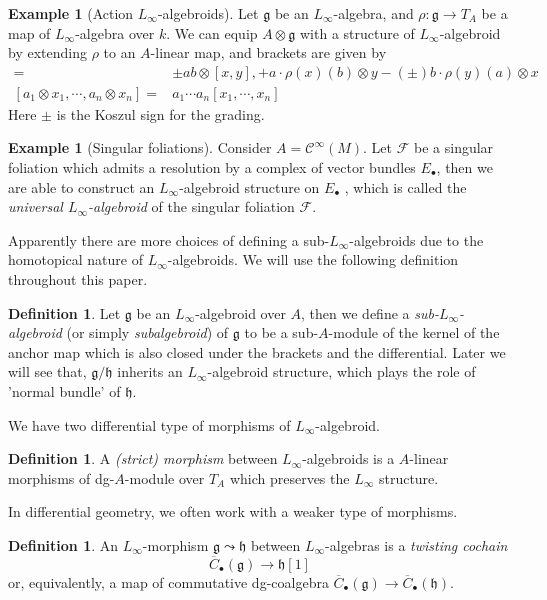 \documentclass[12pt]{amsart}
\theoremstyle{definition}
\newtheorem{example}[thm]{Example}
\newtheorem{defn}[thm]{Definition}
\theoremstyle{remark}
\numberwithin{equation}{section}
\newcommand{\CF}{{\mathcal F}}
\newcommand{\cinf}{{\mathcal C}^{\infty}}
\newcommand{\1}{{\mathbb{1}}}
\newcommand{\g}{\mathfrak{g}}
\newcommand{\h}{\mathfrak{h}}
\begin{document}
\begin{example}[Action $L_{\infty}$-algebroids]
    Let $\g$ be an $L_{\infty}$-algebra, and $\rho: \g \to T_A$ be a map of $L_{\infty}$-algebra over $k$. We can equip $A\otimes \g$ with a structure of $L_{\infty}$-algebroid by extending $\rho$ to an $A$-linear map, and brackets are given by
    \begin{align*}
        [a\otimes x, b\otimes y] =& \pm ab\otimes [x, y], + a\cdot \rho(x)(b) \otimes y - (\pm)b\cdot \rho(y)(a) \otimes x\\
        [a_1 \otimes x_1, \cdots, a_n \otimes x_n] =& a_1\cdots a_n[x_1, \cdots, x_n]
    \end{align*}
    Here $\pm$ is the Koszul sign for the grading.
\end{example}

\begin{example}[Singular foliations]
    Consider $A = \cinf(M)$. Let $\CF$ be a singular foliation which admits a resolution by a complex of vector bundles $E_{\bullet}$, then we are able to construct an $L_{\infty}$-algebroid structure on $E_{\bullet}$ \cite{LLS20}, which is called the {\it universal $L_{\infty}$-algebroid} of the singular foliation $\CF$.
\end{example}

Apparently there are more choices of defining a sub-$L_{\infty}$-algebroids due to the homotopical nature of $L_{\infty}$-algebroids. We will use the following definition throughout this paper.
\begin{defn}
Let $\g$ be an $L_{\infty}$-algebroid over $A$, then we define a {\it sub-$L_{\infty}$-algebroid} (or simply {\it subalgebroid}) of $\g$ to be a sub-$A$-module of the kernel of the anchor map which is also closed under the brackets and the differential. Later we will see that, $\g/\h$ inherits an $L_{\infty}$-algebroid structure, which plays the role of 'normal bundle' of $\h$. 
\end{defn}
We have two differential type of morphisms of $L_{\infty}$-algebroid.
\begin{defn}
	A {\it (strict) morphism} between $L_{\infty}$-algebroids is a $A$-linear morphisms of dg-$A$-module over $T_A$ which preserves the $L_{\infty}$ structure.
\end{defn}

In differential geometry, we often work with a weaker type of morphisms. 
\begin{defn}
An $L_{\infty}$-morphism $\g \leadsto \h$  between $L_{\infty}$-algebras is a {\it twisting cochain}
$$
\overline{C}_{\bullet}(\g) \to \h[1]
$$
or, equivalently, a map of commutative dg-coalgebra $\overline{C}_{\bullet}(\g) \to \overline{C}_{\bullet}(\h)$.
\end{defn}
\end{document}
